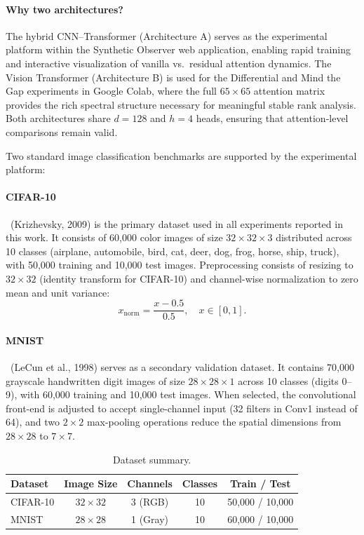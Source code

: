 \documentclass[12pt, a4paper]{article}
\begin{document}
\paragraph{Why two architectures?}
The hybrid CNN--Transformer (Architecture A) serves as the experimental
platform within the Synthetic Observer web application, enabling rapid
training and interactive visualization of vanilla vs.\ residual attention
dynamics. The Vision Transformer (Architecture B) is used for the
Differential and Mind the Gap experiments in Google Colab, where the
full $65 \times 65$ attention matrix provides the rich spectral
structure necessary for meaningful stable rank analysis. Both
architectures share $d = 128$ and $h = 4$ heads, ensuring that
attention-level comparisons remain valid.

Two standard image classification benchmarks are supported by the
experimental platform:

\paragraph{CIFAR-10}~(Krizhevsky, 2009) is the primary dataset used in
all experiments reported in this work. It consists of 60{,}000 color
images of size $32 \times 32 \times 3$ distributed across 10 classes
(airplane, automobile, bird, cat, deer, dog, frog, horse, ship, truck),
with 50{,}000 training and 10{,}000 test images. Preprocessing consists
of resizing to $32 \times 32$ (identity transform for CIFAR-10) and
channel-wise normalization to zero mean and unit variance:
\begin{equation}
    x_{\text{norm}} = \frac{x - 0.5}{0.5}, \quad x \in [0, 1].
    \label{eq:cifar_norm}
\end{equation}

\paragraph{MNIST}~(LeCun et al., 1998) serves as a secondary validation
dataset. It contains 70{,}000 grayscale handwritten digit images of size
$28 \times 28 \times 1$ across 10 classes (digits 0--9), with 60{,}000
training and 10{,}000 test images. When selected, the convolutional
front-end is adjusted to accept single-channel input (32 filters in
Conv1 instead of 64), and two $2 \times 2$ max-pooling operations reduce
the spatial dimensions from $28 \times 28$ to $7 \times 7$.

\begin{table}[H]
\centering
\caption{Dataset summary.}
\label{tab:datasets}
\begin{tabular}{@{}lcccc@{}}
\toprule
\textbf{Dataset} & \textbf{Image Size} & \textbf{Channels} & \textbf{Classes} & \textbf{Train / Test} \\
\midrule
CIFAR-10 & $32 \times 32$ & 3 (RGB) & 10 & 50{,}000 / 10{,}000 \\
MNIST    & $28 \times 28$ & 1 (Gray) & 10 & 60{,}000 / 10{,}000 \\
\bottomrule
\end{tabular}
\end{table}
\end{document}
